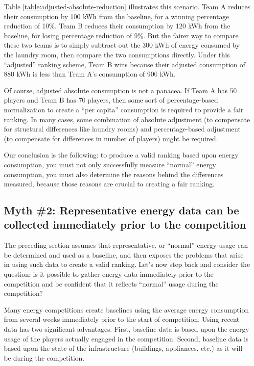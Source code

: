 \documentclass[jou]{apa} %
\begin{document}
Table \ref{table:adjusted-absolute-reduction} illustrates this scenario.  Team A reduces
their consumption by 100 kWh from the baseline, for a winning percentage reduction of 10\%. Team B
reduces their consumption by 120 kWh from the baseline, for losing percentage reduction of
9\%.  But the fairer way to compare these two teams is to simply subtract out the 300 kWh
of energy consumed by the laundry room, then compare the two consumptions directly.  Under
this ``adjusted'' ranking scheme, Team B wins because their adjusted consumption of 880
kWh is less than Team A's consumption of 900 kWh.

Of course, adjusted absolute consumption is not a panacea.  If Team A has 50 players and
Team B has 70 players, then some sort of percentage-based normalization to create a ``per
capita'' consumption is required to provide a fair ranking.  In many cases, some
combination of absolute adjustment (to compensate for structural differences like laundry
rooms) and percentage-based adjustment (to compensate for differences in number of
players) might be required.

Our conclusion is the following: to produce a valid ranking based upon energy consumption,
you must not only successfully measure ``normal'' energy consumption, you must also
determine the reasons behind the differences measured, because those reasons are crucial
to creating a fair ranking.

\subsection{Myth \#2: Representative energy data can be collected immediately prior to the competition}

The preceding section assumes that representative, or ``normal'' energy usage can be
determined and used as a baseline, and then exposes the problems that arise in using such
data to create a valid ranking.  Let's now step back and consider the question: is it
possible to gather energy data immediately prior to the competition and be confident that
it reflects ``normal'' usage during the competition?

Many energy competitions create baselines using the average energy consumption from
several weeks immediately prior to the start of competition.  Using recent data has two
significant advantages. First, baseline data is based upon the energy usage of the players
actually engaged in the competition.  Second, baseline data is based upon the state of the
infrastructure (buildings, appliances, etc.) as it will be during the competition.
\end{document}
